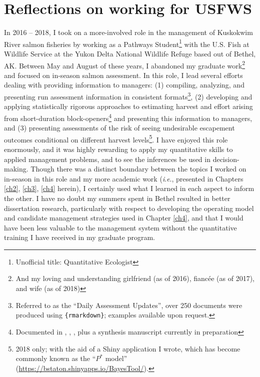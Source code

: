 \documentclass[12pt,]{book}
\let\rmarkdownfootnote\footnote%
\def\footnote{\protect\rmarkdownfootnote}
\theoremstyle{definition}
\theoremstyle{definition}
\theoremstyle{definition}
\theoremstyle{remark}
\begin{document}
\section{Reflections on working for
USFWS}\label{reflections-on-working-for-usfws}

\noindent
In 2016 -- 2018, I took on a more-involved role in the management of
Kuskokwim River salmon fisheries by working as a Pathways
Student\footnote{Unofficial title: Quantitative Ecologist} with the U.S.
Fish at Wildlife Service at the Yukon Delta National Wildlife Refuge
based out of Bethel, AK. Between May and August of these years, I
abandoned my graduate work\footnote{And my loving and understanding
  girlfriend (as of 2016), fiancée (as of 2017), and wife (as of 2018)}
and focused on in-season salmon assessment. In this role, I lead several
efforts dealing with providing information to managers: (1) compiling,
analyzing, and presenting run assessment information in consistent
formats\footnote{Referred to as the ``Daily Assessment Updates'', over
  250 documents were produced using \texttt{\{rmarkdown\}}; examples
  available upon request.}, (2) developing and applying statistically
rigorous approaches to estimating harvest and effort arising from
short-duration block-openers\footnote{Documented in
  \citet{staton-coggins-2016}, \citet{staton-coggins-2017},
  \citet{staton-2018}, plus a synthesis manuscript currently in
  preparation} and presenting this information to managers, and (3)
presenting assessments of the risk of seeing undesirable escapement
outcomes conditional on different harvest levels\footnote{2018 only;
  with the aid of a Shiny application I wrote, which has become commonly
  known as the ``\(P^*\) model''
  (\url{https://bstaton.shinyapps.io/BayesTool/}).}. I have enjoyed this
role enormously, and it was highly rewarding to apply my quantitative
skills to applied management problems, and to see the inferences be used
in decision-making. Though there was a distinct boundary between the
topics I worked on in-season in this role and my more academic work
(\emph{i}.\emph{e}., presented in Chapters \ref{ch2}, \ref{ch3},
\ref{ch4} herein), I certainly used what I learned in each aspect to
inform the other. I have no doubt my summers spent in Bethel resulted in
better dissertation research, particularly with respect to developing
the operating model and candidate management strategies used in Chapter
\ref{ch4}, and that I would have been less valuable to the management
system without the quantitative training I have received in my graduate
program.
\end{document}
